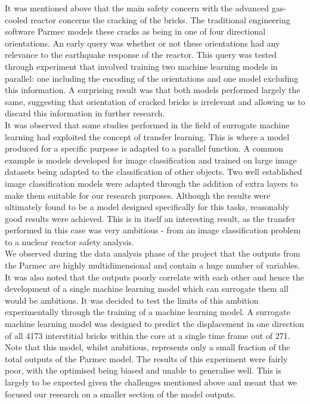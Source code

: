  \noindent
 It was mentioned above that the main safety concern with the advanced gas-cooled reactor concerns the cracking of the bricks. The traditional engineering software Parmec models these cracks as being in one of four directional orientations. An early query was whether or not these orientations had any relevance to the earthquake response of the reactor. This query was tested through experiment that involved training two machine learning models in parallel: one including the encoding of the orientations and one model excluding this information. A surprising result was that both models performed largely the same, suggesting that orientation of cracked bricks is irrelevant and allowing us to discard this information in further research. \\
 
 \noindent 
 It was observed that some studies performed in the field of surrogate machine learning had exploited the concept of transfer learning. This is where a model produced for a specific purpose is adapted to a parallel function. A common example is models developed for image classification and trained on large image datasets being adapted to the classification of other objects. Two well established image classification models were adapted through the addition of extra layers to make them suitable for our research purposes. Although the results were ultimately found to be a model designed specifically for this tasks, reasonably good results were achieved. This is in itself an interesting result, as the transfer performed in this case was very ambitious - from an image classification problem to a nuclear reactor safety analysis.
 \\
  
 \noindent 
 We observed during the data analysis phase of the project that the outputs from the Parmec are highly multidimensional and contain a huge number of variables. It was also noted that the outputs poorly correlate with each other and hence the development of a single machine learning model which can surrogate them all would be ambitious. It was decided to test the limits of this ambition experimentally through the training of a machine learning model. A surrogate machine learning model was designed to predict the displacement in one direction of all 4173 interstitial bricks within the core at a single time frame out of 271. Note that this model, whilst ambitious, represents only a small fraction of the total outputs of the Parmec model. The results of this experiment were fairly poor, with the optimised being biased and unable to generalise well. This is largely to be expected given the challenges mentioned above and meant that we focused our research on a smaller section of the model outputs. \\
 
